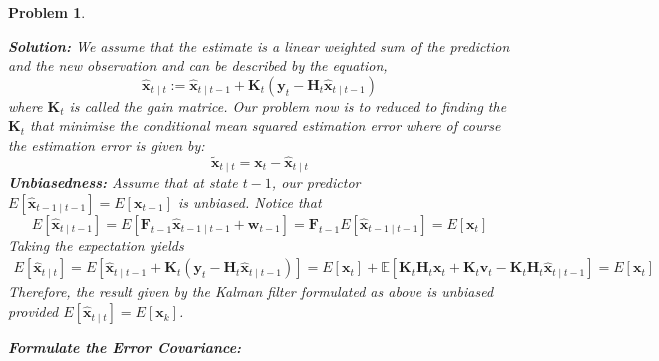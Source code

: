 \documentclass[11pt]{article}
\theoremstyle{plain} %
\newtheorem{problem}[theorem]{Problem}
\newenvironment{solution}
{\color{C2}\normalfont\begin{framed}\begingroup\textbf{Solution:} }
  {\endgroup\end{framed}}
\theoremstyle{remark}
\newcommand{\EE}{\mathbb{E}}
\begin{document}
\begin{problem}
\begin{enumerate}[label=(\alph*)]
        \begin{solution}
          We assume that the estimate is a
          linear weighted sum of the prediction and the new observation and can
          be described by the equation,
          $$
          \hat{\mathbf{x}}_{t \mid t} :=\hat{\mathbf{x}}_{t \mid t-1}+\mathbf{K}_{t}\left(\mathbf{y}_{t}-\mathbf{H}_{t} \hat{\mathbf{x}}_{t \mid t-1}\right)
          $$
          where $\mathbf{K}_{t}$ is called the
          gain matrice. Our problem now is to reduced to
          finding the $\mathbf{K}_{t}$ that
          minimise the conditional mean squared estimation error where of course
          the estimation error is given by:
          $$
            \widetilde{\mathbf{x}}_{t \mid t} = \mathbf{x}_{t} -\hat{\mathbf{x}}_{t \mid t}
          $$
          \textbf{Unbiasedness:}
          Assume that at state $t - 1$, our predictor $E\left[\hat{\mathbf{x}}_{t-1 \mid t-1}\right]=E\left[\mathbf{x}_{t-1}\right]$ is unbiased. Notice that
          $$
              E\left[\hat{\mathbf{x}}_{t \mid t-1}\right] =E\left[\mathbf{F}_{t-1} \hat{\mathbf{x}}_{t-1 \mid t-1} + \mathbf{w}_{t-1}\right] =\mathbf{F}_{t-1} E\left[\hat{\mathbf{x}}_{t-1 \mid t-1}\right]
              =E\left[\mathbf{x}_{t}\right]
          $$
          Taking the expectation yields
          $$
            \begin{aligned}
              E\left[\hat{\mathbf{x}}_{t \mid t}\right] =E\left[\hat{\mathbf{x}}_{t \mid t-1}+\mathbf{K}_{t}\left(\mathbf{y}_{t}-\mathbf{H}_{t} \hat{\mathbf{x}}_{t \mid t-1}\right)\right] 
               =E\left[\mathbf{x}_{t}\right] + \EE\left[\mathbf{K}_{t}\mathbf{H}_t\mathbf{x}_{t} + \mathbf{K}_{t}\mathbf{v}_{t} -\mathbf{K}_{t}\mathbf{H}_{t} \hat{\mathbf{x}}_{t \mid t-1}\right] = E\left[\mathbf{x}_{t}\right]
            \end{aligned}
          $$
          Therefore, the result given by the Kalman filter formulated as above is unbiased provided $E\left[\hat{\mathbf{x}}_{t \mid t}\right]=E\left[\mathbf{x}_{k}\right]$.

            \textbf{Formulate the Error Covariance:}


\end{solution}
\end{enumerate}
\end{problem}
\end{document}
